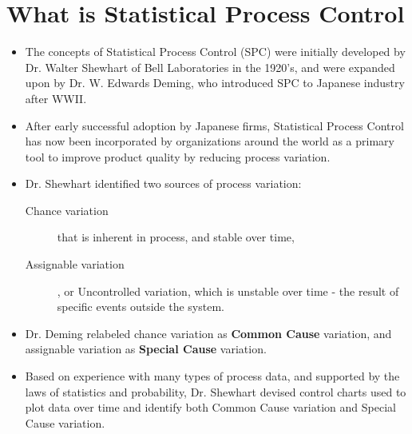 \documentclass[]{article}
\begin{document}
\section{What is Statistical Process Control}
{
\large
\begin{itemize}
\item The concepts of Statistical Process Control (SPC) were initially developed by Dr. Walter Shewhart of Bell Laboratories in the 1920's, and were expanded upon by Dr. W. Edwards Deming, who introduced SPC to Japanese industry after WWII.
\item After early successful adoption by Japanese firms, Statistical Process Control has now been incorporated by organizations around the world as a primary tool to improve product quality by reducing process variation.
\item Dr. Shewhart identified two sources of process variation: 
\begin{description}
\item[Chance variation] that is inherent in process, and stable over time, 
\item[Assignable variation], or Uncontrolled variation, which is unstable over time - the result of specific events outside the system.
\end{description}
 
\item Dr. Deming relabeled chance variation as \textbf{Common Cause} variation, and assignable variation as \textbf{Special Cause} variation.
\item Based on experience with many types of process data, and supported by the laws of statistics and probability, Dr. Shewhart devised control charts used to plot data over time and identify both Common Cause variation and Special Cause variation.
\end{itemize}
}
%
%
%
\end{document}
